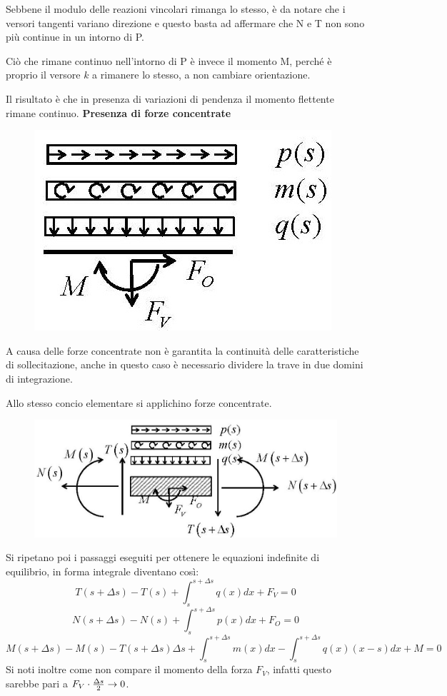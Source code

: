 \documentclass{article}
\begin{document}
\begin{adjustwidth}{2in}{}
 	Sebbene il modulo delle reazioni vincolari rimanga lo stesso, è da notare che i versori tangenti variano direzione e questo basta ad affermare che N e T non sono più
 	continue in un intorno di P.
 	
 	Ciò che rimane continuo nell’intorno di P è invece il momento M, perché è proprio il versore $k$ a rimanere lo stesso, a non cambiare orientazione. \newline
 	
 	Il risultato è che in presenza di variazioni di pendenza il momento flettente rimane continuo. \newline
\newpage
\textbf{Presenza di forze concentrate}

\begin{figure}[H]
	\centering
	\includegraphics[width=0.3\linewidth]{"immagini/1.PARTE5_Pagina_17 (2)"}
\end{figure}
	A causa delle forze concentrate non è garantita la continuità delle caratteristiche di sollecitazione, anche in questo caso è necessario 
	dividere la trave in due domini di integrazione.
	
	Allo stesso concio elementare si applichino forze concentrate. 
	
\begin{figure}[H]
	\centering
	\includegraphics[width=0.4\linewidth]{"immagini/1.PARTE5_Pagina_17"}
\end{figure}
	Si ripetano poi i passaggi eseguiti per ottenere le equazioni indefinite di equilibrio, in forma integrale diventano così: 
	\[
	T(s+\Delta s) - T(s) + \int_{s}^{s+\Delta s} q(x)dx + F_V= 0
	\]
	\[
	N(s+\Delta s) - N(s) + \int_{s}^{s+\Delta s} p(x)dx + F_O = 0
	\]
	\[
	M(s+\Delta s) - M(s) -T(s+\Delta s)\Delta s + \int_{s}^{s+\Delta s} m(x)dx - \int_{s}^{s+\Delta s} q(x)(x-s)dx + M= 0
	\]
	Si noti inoltre come non compare il momento della forza $F_V$, infatti questo sarebbe pari a $F_V\cdot{\Delta s\over 2}\rightarrow 0$. \newline 
	

\end{adjustwidth}
\end{document}
